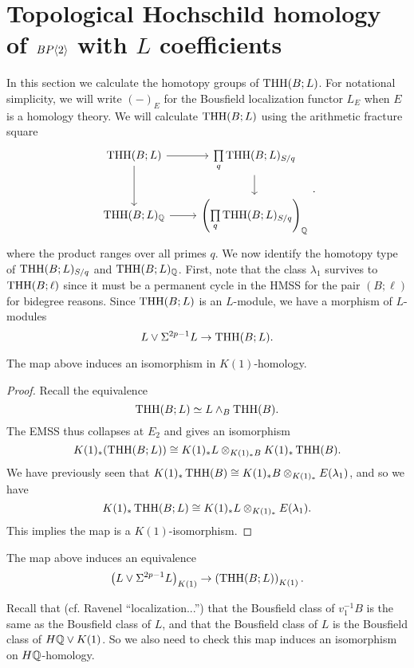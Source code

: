 \section{Topological Hochschild homology of $BP\langle 2 \rangle$ with $L$ coefficients}
In this section we calculate the homotopy groups of $\operatorname{THH}(B;L)$. For notational simplicity, we will write $(-)_{E}$ for the Bousfield localization functor $L_E$ when $E$ is a homology theory. We will calculate $\operatorname{THH}(B;L)$ using the arithmetic fracture square
\[
\begin{tikzcd}
	\THH(B;L)\arrow[r]\arrow[d] & \underset{q}{\prod}  \THH(B;L)_{S/q}\arrow[d]\\
	\THH(B;L)_{\Q} \arrow[r] & \left(\underset{q}{\prod} \THH(B;L)_{S/q}\right)_{\Q}
\end{tikzcd}.
\]
where the product ranges over all primes $q$. 
We now identify the homotopy type of $\operatorname{THH}(B;L)_{S/q}$ and $\operatorname{THH}(B;L)_\mathbb{Q}$. First, note that the class $\lambda_1$ survives to $\operatorname{THH}(B;\ell)$ since it must be a permanent cycle in the HMSS for the pair $(B;\ell)$ for bidegree reasons. Since $\operatorname{THH}(B;L)$ is an $L$-module, we have a morphism of $L$-modules
\[
L\vee \Sigma^{2p-1}L\to \operatorname{THH}(B;L). 
\]

\begin{prop}
	The map above induces an isomorphism in $K(1)$-homology. 
\end{prop}
\begin{proof}
	Recall the equivalence
	\[
	\operatorname{THH}(B;L)\simeq L\wedge_B\operatorname{THH}(B).
	\]
	The EMSS thus collapses at $E_2$ and gives an isomorphism
	\[
	K(1)_*(\operatorname{THH}(B;L))\cong K(1)_*L\otimes_{K(1)_*B}K(1)_*\operatorname{THH}(B).
	\]
	We have previously seen that 
	$K(1)_*\operatorname{THH}(B)\cong K(1)_*B\otimes_{K(1)_*} E(\lambda_1)$, and so we have 
	\[
	K(1)_*\operatorname{THH}(B;L)\cong K(1)_*L\otimes_{K(1)_*}E(\lambda_1). 
	\]
	This implies the map is a $K(1)$-isomorphism. 
\end{proof}

\begin{cor}
	The map above induces an equivalence
	\[
	\left (L\vee \Sigma^{2p-1}L\right )_{K(1)} \to \left (\operatorname{THH}(B;L)\right)_{K(1)}. 
	\]
\end{cor}

\begin{rem}
	Recall that (cf. Ravenel ``localization...'') that the Bousfield class of $v_1^{-1}B$ is the same as the Bousfield class of $L$, and that the Bousfield class of $L$ is the Bousfield class of $H\mathbb{Q}\vee K(1)$. So we also need to check this map induces an isomorphism on $H\mathbb{Q}$-homology. 
\end{rem}

